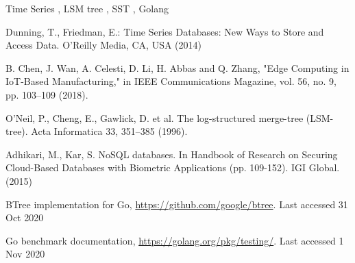 \documentclass[
]{ceurart}
\begin{document}
\begin{keywords}
	Time Series \sep
	LSM tree \sep 
	SST \sep 
	Golang	
\end{keywords}

\maketitle

%
%
%




%
%
%
% 
% 
%
\begin{thebibliography}{8}
Dunning, T., Friedman, E.: Time Series Databases: New Ways to Store and Access Data. O'Reilly Media, CA, USA  (2014)

B. Chen, J. Wan, A. Celesti, D. Li, H. Abbas and Q. Zhang, "Edge Computing in IoT-Based Manufacturing," in IEEE Communications Magazine, vol. 56, no. 9, pp. 103--109 (2018). 

O’Neil, P., Cheng, E., Gawlick, D. et al. The log-structured merge-tree (LSM-tree). Acta Informatica 33, 351--385 (1996). 

Adhikari, M., Kar, S. NoSQL databases. In Handbook of Research on Securing Cloud-Based Databases with Biometric Applications (pp. 109-152). IGI Global. (2015)

BTree implementation for Go, \url{https://github.com/google/btree}. Last accessed 31
Oct 2020

Go benchmark documentation, \url{https://golang.org/pkg/testing/}. Last accessed 1
Nov 2020

\end{thebibliography}
\end{document}
